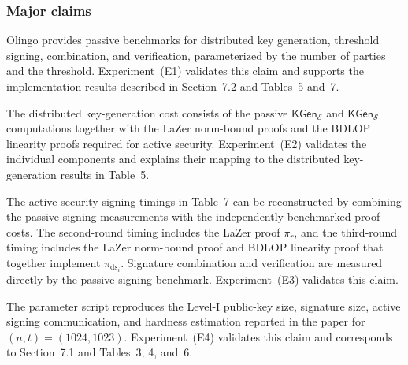 \documentclass[nonacm,sigconf]{acmart}
\begin{document}

\subsubsection{Major claims}

\bigskip

\begin{compactitem}
  \item[(C1):] Olingo provides passive benchmarks for distributed key generation, threshold signing, combination, and verification, parameterized by the number of parties and the threshold. Experiment~(E1) validates this claim and supports the implementation results described in Section~7.2 and Tables~5 and~7.
  \item[(C2):] The distributed key-generation cost consists of the passive $\mathsf{KGen}_{\mathcal{E}}$ and $\mathsf{KGen}_{\mathcal{S}}$ computations together with the LaZer norm-bound proofs and the BDLOP linearity proofs required for active security. Experiment~(E2) validates the individual components and explains their mapping to the distributed key-generation results in Table~5.
  \item[(C3):] The active-security signing timings in Table~7 can be reconstructed by combining the passive signing measurements with the independently benchmarked proof costs. The second-round timing includes the LaZer proof $\pi_r$, and the third-round timing includes the LaZer norm-bound proof and BDLOP linearity proof that together implement $\pi_{\mathrm{ds}_i}$. Signature combination and verification are measured directly by the passive signing benchmark. Experiment~(E3) validates this claim.
  \item[(C4):] The parameter script reproduces the Level-I public-key size, signature size, active signing communication, and hardness estimation reported in the paper for $(n,t)=(1024,1023)$. Experiment~(E4) validates this claim and corresponds to Section~7.1 and Tables~3, 4, and~6.
\end{compactitem}
\end{document}
